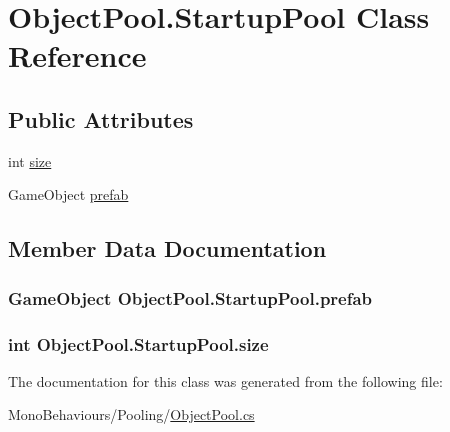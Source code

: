 \hypertarget{class_object_pool_1_1_startup_pool}{}\section{Object\+Pool.\+Startup\+Pool Class Reference}
\label{class_object_pool_1_1_startup_pool}
\subsection*{Public Attributes}
\begin{DoxyCompactItemize}
\item 
int \hyperlink{class_object_pool_1_1_startup_pool_a5edd1a6e6eb9c58b75233b641bffb8ef}{size}
\item 
Game\+Object \hyperlink{class_object_pool_1_1_startup_pool_a2bda7f7361547d012d331f23f6594c56}{prefab}
\end{DoxyCompactItemize}


\subsection{Member Data Documentation}
\subsubsection[{\texorpdfstring{prefab}{prefab}}]{\setlength{\rightskip}{0pt plus 5cm}Game\+Object Object\+Pool.\+Startup\+Pool.\+prefab}\hypertarget{class_object_pool_1_1_startup_pool_a2bda7f7361547d012d331f23f6594c56}{}\label{class_object_pool_1_1_startup_pool_a2bda7f7361547d012d331f23f6594c56}
\subsubsection[{\texorpdfstring{size}{size}}]{\setlength{\rightskip}{0pt plus 5cm}int Object\+Pool.\+Startup\+Pool.\+size}\hypertarget{class_object_pool_1_1_startup_pool_a5edd1a6e6eb9c58b75233b641bffb8ef}{}\label{class_object_pool_1_1_startup_pool_a5edd1a6e6eb9c58b75233b641bffb8ef}


The documentation for this class was generated from the following file\+:\begin{DoxyCompactItemize}
\item 
Mono\+Behaviours/\+Pooling/\hyperlink{_object_pool_8cs}{Object\+Pool.\+cs}\end{DoxyCompactItemize}
